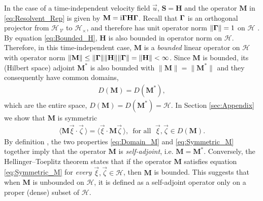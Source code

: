 \documentclass[11pt]{amsart}
\newcommand{\I}{\mathrm{i}}
\newcommand{\Mb}{\mathbf{M}}
\newcommand{\Hb}{\mathbf{H}}
\newcommand{\Sb}{\mathbf{S}}
\newcommand{\Vc}{\mathcal{V}}
\newcommand{\Hs}{\mathscr{H}}
\newcommand\bGamma{\mbox{\boldmath${\Gamma}$}}
\begin{document}
In the case of a time-independent velocity field $\vec{u}$, $\Sb=\Hb$
and the operator $\Mb$ in \eqref{eq:Resolvent_Rep} is given by
$\Mb=\I\bGamma\Hb\bGamma$. Recall that $\bGamma$ is an orthogonal
projector from $\Hs_{\,\Vc}$ to $\Hs_\times$, and therefore has unit operator
norm $\|\bGamma\|=1$ on $\Hs$ \cite{Reed-1980,Stone:64}. By equation
\eqref{eq:Bounded_H}, $\Hb$ is also bounded in operator
norm on $\Hs$. Therefore, in this time-independent case, $\Mb$ is a
\emph{bounded} linear operator on $\Hs$ with operator norm 
$\|\Mb\|\leq\|\bGamma\|\|\Hb\|\|\bGamma\|=\|\Hb\|<\infty$. Since $\Mb$ is bounded, its
(Hilbert space) adjoint $\Mb^*$ is also bounded with 
$\|\Mb\|=\|\Mb^*\|$ \cite{Reed-1980} and they consequently have common
domains, 
%
\begin{align}\label{eq:Domain_M}
  D(\Mb)=D(\Mb^*),
\end{align}
%
which are the entire space, $D(\Mb)=D(\Mb^*)=\Hs$. In
Section \ref{sec:Appendix} we show that $\Mb$ is symmetric  
%
\begin{align}\label{eq:Symmetric_M}
  \langle\Mb\vec{\xi}\cdot\vec{\zeta}\,\rangle=\langle\vec{\xi}\cdot\Mb\vec{\zeta}\,\rangle,
  \, \text{ for all } \; \vec{\xi},\vec{\zeta}\in D(\Mb).
\end{align}
%
By definition \cite{Reed-1980}, the two properties \eqref{eq:Domain_M}
and \eqref{eq:Symmetric_M} together imply that the operator $\Mb$ is
\emph{self-adjoint}, i.e. $\Mb=\Mb^*$. Conversely, the
Hellinger--Toeplitz theorem \cite{Reed-1980} states that if the
operator $\Mb$ satisfies equation \eqref{eq:Symmetric_M} 
for \emph{every} $\vec{\xi},\vec{\zeta}\in\Hs$, then $\Mb$ is bounded. This
suggests that when $\Mb$ is unbounded on $\Hs$, it is defined as a 
self-adjoint operator only on a proper (dense) subset of $\Hs$. 
\end{document}
